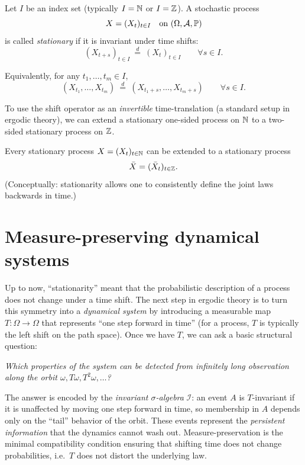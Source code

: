\begin{definition}

Let \(I\) be an index set (typically \(I=\mathbb{N}\) or \(I=\mathbb{Z}\)). A stochastic process
\[
X=(X_t)_{t\in I} \quad \text{on } (\Omega,\mathcal{A},\mathbb{P})
\]
is called \emph{stationary} if it is invariant under time shifts:
\[
(X_{t+s})_{t\in I} \ \stackrel{d}{=} \ (X_t)_{t\in I}
\qquad \forall s\in I.
\]

Equivalently, for any \(t_1,\dots,t_m\in I\),
\[
(X_{t_1},\dots,X_{t_m}) \ \stackrel{d}{=} \ (X_{t_1+s},\dots,X_{t_m+s})
\qquad \forall s\in I.
\]
    
\end{definition}

\begin{remark}
To use the shift operator as an \emph{invertible} time-translation (a standard setup in ergodic theory), we can extend a stationary one-sided process on $\mathbb{N}$ to a two-sided stationary process on $\mathbb{Z}$.

\begin{lemma}
Every stationary process \(X=(X_t)_{t\in\mathbb{N}}\) can be extended to a stationary process
\[
\bar X=(\bar X_t)_{t\in\mathbb{Z}}.
\]
(Conceptually: stationarity allows one to consistently define the joint laws backwards in time.)

\end{lemma}
    
\end{remark}



\section{Measure-preserving dynamical systems}

Up to now, ``stationarity'' meant that the probabilistic description of a process does not change under a time shift.
The next step in ergodic theory is to turn this symmetry into a \emph{dynamical system} by introducing a measurable
map $T:\Omega\to\Omega$ that represents ``one step forward in time'' (for a process, $T$ is typically the left shift on
the path space). Once we have $T$, we can ask a basic structural question:

\medskip
\emph{Which properties of the system can be detected from infinitely long observation along the orbit
$\omega, T\omega, T^2\omega,\dots$?}

\medskip
The answer is encoded by the \emph{invariant $\sigma$-algebra} $\mathcal{I}$: an event $A$ is $T$-invariant if it is
unaffected by moving one step forward in time, so membership in $A$ depends only on the ``tail'' behavior of the orbit.
These events represent the \emph{persistent information} that the dynamics cannot wash out. Measure-preservation is the
minimal compatibility condition ensuring that shifting time does not change probabilities, i.e.\ $T$ does not distort
the underlying law.

